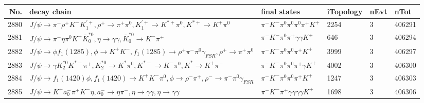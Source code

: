 \begin{table}[htbp] 
\begin{center}
\begin{small}
\begin{tabular}{rlllll}\hline\hline
 No. & decay chain & final states &  iTopology & nEvt & nTot \\\hline
2880&$J/\psi       \rightarrow \pi^{-}        \rho^{+}      K^{-}          K_1^{'+}      , \rho^{+}       \rightarrow \pi^{+}        \pi^{0}        , K_1^{'+}       \rightarrow K^{*+}         \pi^{0}        , K^{*+}          \rightarrow K^{+}          \pi^{0}        $&$\pi^{-}        K^{-}          \pi^{0}        \pi^{0}        \pi^{0}        \pi^{+}        K^{+}          $& 2254&    3&406291\\
2881&$J/\psi       \rightarrow \pi^{-}        \eta          \pi^{0}        K^{+}          \bar{K}_0^{*0}, \eta           \rightarrow \gamma       \gamma       , \bar{K}_0^{*0} \rightarrow K^{-}          \pi^{+}        $&$\pi^{-}        K^{-}          \pi^{0}        \pi^{+}        \gamma       \gamma       K^{+}          $&  646&    3&406294\\
2882&$J/\psi       \rightarrow \phi           f_{1}(1285)    , \phi            \rightarrow K^{+}          K^{-}          , f_{1}(1285)     \rightarrow \rho^{+}      \pi^{-}        \pi^{0}        \gamma_{FSR} , \rho^{+}       \rightarrow \pi^{+}        \pi^{0}        $&$\pi^{-}        K^{-}          \pi^{0}        \pi^{0}        \pi^{+}        K^{+}          $& 3999&    3&406297\\
2883&$J/\psi       \rightarrow \gamma       K_2^{*0}       K^{*-}         \pi^{+}        , K_2^{*0}        \rightarrow K^{*}          \pi^{0}        , K^{*-}          \rightarrow K^{-}          \pi^{0}        , K^{*}           \rightarrow K^{+}          \pi^{-}        $&$\pi^{-}        K^{-}          \pi^{0}        \pi^{0}        \pi^{+}        \gamma       K^{+}          $& 4002&    3&406300\\
2884&$J/\psi       \rightarrow f_{1}(1420)    \phi           , f_{1}(1420)     \rightarrow K^{+}          K^{-}          \pi^{0}        , \phi            \rightarrow \rho^{-}      \pi^{+}        , \rho^{-}       \rightarrow \pi^{-}        \pi^{0}        \gamma_{FSR} $&$\pi^{-}        K^{-}          \pi^{0}        \pi^{0}        \pi^{+}        K^{+}          $& 1247&    3&406303\\
2885&$J/\psi       \rightarrow K^{+}          a_{0}^{-}      \pi^{+}        K^{-}          \eta          , a_{0}^{-}       \rightarrow \eta          \pi^{-}        , \eta           \rightarrow \gamma       \gamma       , \eta           \rightarrow \gamma       \gamma       $&$\pi^{-}        K^{-}          \pi^{+}        \gamma       \gamma       \gamma       \gamma       K^{+}          $& 1698&    3&406306\\

\end{tabular}
\end{small}
\end{center}
\end{table}
